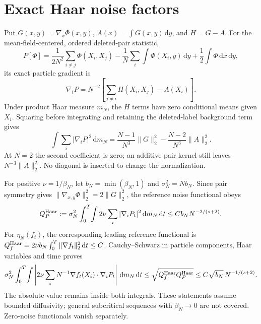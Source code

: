 \documentclass[10pt]{article}
\newcommand{\dd}{\,\mathrm d}
\begin{document}
\section*{Exact Haar noise factors}
Put $G(x,y)=\nabla_x\Phi(x,y)$, $A(x)=\int G(x,y)\dd y$, and $H=G-A$.
For the mean-field-centered, ordered deleted-pair statistic,
\[
 P[\Phi]=\frac1{2N^2}\sum_{i\ne j}\Phi(X_i,X_j)
 -\frac1N\sum_i\int\Phi(X_i,y)\dd y+\frac12\int\Phi\dd x\dd y,
\]
its exact particle gradient is
\[
 \nabla_iP=N^{-2}\left[\sum_{j\ne i}H(X_i,X_j)-A(X_i)\right].
\]
Under product Haar measure $m_N$, the $H$ terms have zero conditional means
given $X_i$. Squaring before integrating and retaining the deleted-label
background term gives
\[
 \boxed{\int\sum_i|\nabla_iP|^2\dd m_N
 =\frac{N-1}{N^3}\|G\|_2^2-\frac{N-2}{N^3}\|A\|_2^2.}
\]
At $N=2$ the second coefficient is zero; an additive pair kernel still leaves
$N^{-3}\|A\|_2^2$. No diagonal is inserted to change the normalization.

For positive $\nu=1/\beta_N$, let $b_N=\min(\beta_N,1)$ and
$\sigma_N^2=Nb_N$. Since pair symmetry gives
$\|\nabla_{x,y}\Phi\|_2^2=2\|G\|_2^2$, the reference noise functional obeys
\[
 Q_P^{\rm Haar}:=\sigma_N^2\int_0^T\!\int
 2\nu\sum_i|\nabla_iP_t|^2\dd m_N\dd t
 \le Cb_NN^{-2/(s+2)}.
\]
For $\eta_N(f_t)$, the corresponding leading reference functional is
$Q_f^{\rm Haar}=2\nu b_N\int_0^T\|\nabla f_t\|_2^2\dd t\le C$.
Cauchy--Schwarz in particle components, Haar variables and time proves
\[
 \sigma_N^2\int_0^T\!\int\left|2\nu\sum_i
 N^{-1}\nabla f_t(X_i)\cdot\nabla_iP_t\right|\dd m_N\dd t
 \le\sqrt{Q_f^{\rm Haar}Q_P^{\rm Haar}}
 \le C\sqrt{b_N}\,N^{-1/(s+2)}.
\]
The absolute value remains inside both integrals. These statements assume
bounded diffusivity; general subcritical sequences with $\beta_N\to0$ are
not covered. Zero-noise functionals vanish separately.
\end{document}

